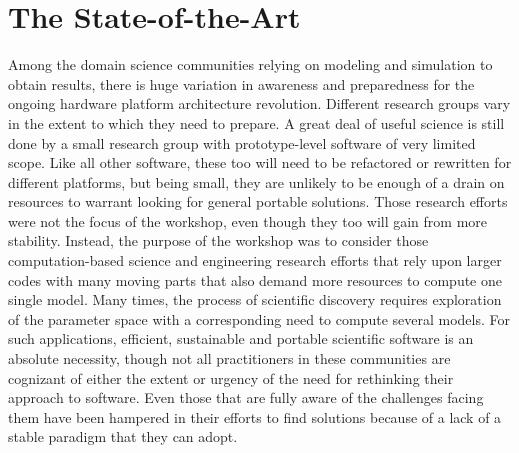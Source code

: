 \section{The State-of-the-Art}

Among the domain science communities relying on modeling and
simulation to obtain results, there is huge variation in awareness and
preparedness for the ongoing hardware platform architecture
revolution. Different research groups vary in the extent to which they
need to prepare. A great deal of useful science is still done by a
small research group with prototype-level software of very limited scope.
Like all other software, these too will
need to be refactored or rewritten for different platforms, but being
small, they are unlikely to be enough of a drain on resources to warrant
looking for general portable solutions. Those research efforts were
not the focus of the workshop, even though they too will gain from more
stability. Instead, the purpose of the workshop was to consider those
computation-based science and engineering research efforts that rely
upon larger codes with many moving parts that also  demand more
resources to compute one single model. Many times, the process of
scientific discovery requires exploration of the parameter space with
a corresponding need to compute several models. For such applications,
efficient, sustainable and portable scientific software is an absolute
necessity, though not all practitioners in these communities are
cognizant of either the extent or urgency of the need for rethinking
their approach to software. Even those that are fully aware of the
challenges facing them have been hampered in  their efforts to find
solutions because of a lack of a stable paradigm that they can adopt.   

